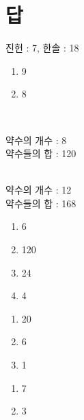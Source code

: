 \documentclass{oblivoir}
\begin{document}
\section*{답}
\begin{multicols*}{2}
%

%

%
진헌 : 7, 한솔 : 18

%

%
\begin{enumerate}
\item
9
\item
8
\end{enumerate}

%

%
\\[-10pt]
\parbox{0.8\textwidth}{약수의 개수 : 8\\
약수들의 합 : 120}

%
\\[-10pt]
약수의 개수 : 12\\
약수들의 합 : 168

%

\columnbreak

%
\begin{enumerate}
\item
6
\item
120
\item
24
\item
4
\end{enumerate}

%

%

%

%

%

%

%
\begin{enumerate}
\item
20
\item
6
\item
1
\end{enumerate}

\columnbreak
%
\begin{enumerate}%
\item
7
\item
3
\end{enumerate}


\end{multicols*}
\end{document}
